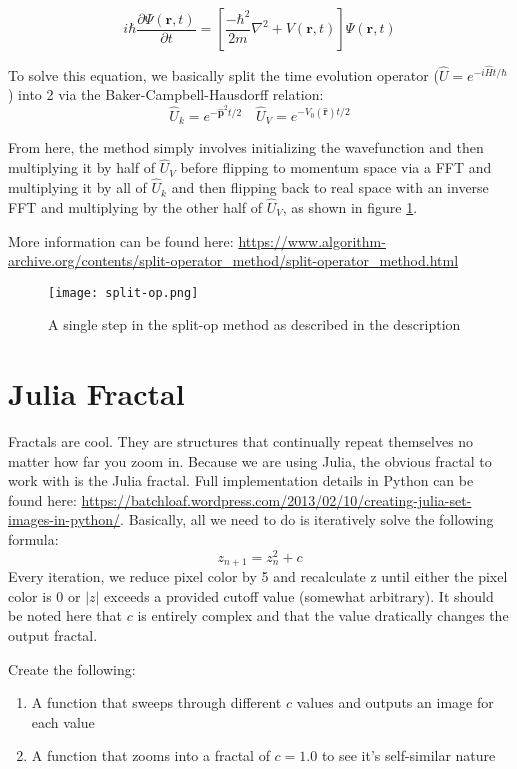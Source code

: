 \documentclass[11pt]{article}
\begin{document}
$$
i \hbar \frac{\partial \Psi(\mathbf{r}, t)}{\partial t} = \left[\frac{-\hbar^2}{2m} \nabla^2 + V(\mathbf{r},t) \right] \Psi(\mathbf{r},t)
$$

To solve this equation, we basically split the time evolution operator ($\hat U = e^{-i \hat H t / \hbar}$) into 2 via the Baker-Campbell-Hausdorff relation:
$$\hat U_k = e^{-\mathbf{\hat p}^2 t / 2} \quad \hat U_V = e^{-V_0(\mathbf{\hat r})t/2}$$

From here, the method simply involves initializing the wavefunction and then multiplying it by half of $\hat U_V$ before flipping to momentum space via a FFT and multiplying it by all of $\hat U_k$ and then flipping back to real space with an inverse FFT and multiplying by the other half of $\hat U_V$, as shown in figure \ref{fig:split-op}.

More information can be found here: \url{https://www.algorithm-archive.org/contents/split-operator_method/split-operator_method.html}

\begin{figure}
\begin{center}
\texttt{[image: split-op.png]}
\end{center}
\caption{A single step in the split-op method as described in the description}
\label{fig:split-op}
\end{figure}

\newpage
\section*{Julia Fractal}
Fractals are cool. They are structures that continually repeat themselves no matter how far you zoom in. Because we are using Julia, the obvious fractal to work with is the Julia fractal. Full implementation details in Python can be found here: \url{https://batchloaf.wordpress.com/2013/02/10/creating-julia-set-images-in-python/}. Basically, all we need to do is iteratively solve the following formula:
$$z_{n+1} = z_n^2 + c$$
Every iteration, we reduce pixel color by 5 and recalculate z until either the pixel color is 0 or $|z|$ exceeds a provided cutoff value (somewhat arbitrary). It should be noted here that $c$ is entirely complex and that the value dratically changes the output fractal.

Create the following: 
\begin{enumerate}
\item A function that sweeps through different $c$ values and outputs an image for each value
\item A function that zooms into a fractal of $c=1.0$ to see it's self-similar nature
\end{enumerate}
\end{document}
